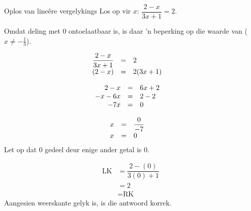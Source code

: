 \begin{wex}{Oplos van lineêre vergelykings}
{Los op vir $x$: $\dfrac{2-x}{3x+1}=2$.} 
{
Omdat deling met $0$ ontoelaatbaar is, is daar ’n beperking op die waarde van ($x\neq -\frac{1}{3}$).

\begin{equation*}
    \begin{array}{ccll}\hfill \dfrac{2-x}{3x+1}& =& 2\hfill & \\
	\hfill (2-x)& =& 2(3x+1)\hfill & \\ 
    \end{array}
\end{equation*}

\begin{equation*}
    \begin{array}{ccll}
	\hfill 2-x& =& 6x+2\hfill & \hfill \\ 
	\hfill -x-6x& =& 2-2\hfill & \hfill \\ 
	\hfill -7x& =& 0\hfill & \hfill
    \end{array}
\end{equation*}

\begin{equation*}
    \begin{array}{ccll}

	\hfill x& =& \dfrac{0}{-7}\hfill & \\
	\hfill x& =& 0\hfill & \hfill 
    \end{array}
\end{equation*}
Let op dat $0$ gedeel deur enige ander getal is $0$.


\begin{equation*}
    \begin{array}{ccc}
  \mbox{LK} &=\dfrac{2-(0)}{3(0)+1} \\
	    &= 2 \\
	    &= \mbox{RK}
\end{array}
\end{equation*}
Aangesien weerskante gelyk is, is die antwoord korrek.
}
\end{wex}


